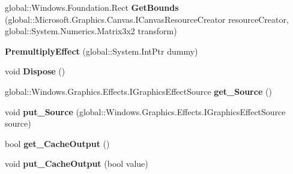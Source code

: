 \begin{DoxyCompactItemize}
global\+::\+Windows.\+Foundation.\+Rect {\bfseries Get\+Bounds} (global\+::\+Microsoft.\+Graphics.\+Canvas.\+I\+Canvas\+Resource\+Creator resource\+Creator, global\+::\+System.\+Numerics.\+Matrix3x2 transform)
\item 
\mbox{\label{class_microsoft_1_1_graphics_1_1_canvas_1_1_effects_1_1_premultiply_effect_a8186cf7bd26fe373a3ab0216db4f0f3a}} 
{\bfseries Premultiply\+Effect} (global\+::\+System.\+Int\+Ptr dummy)
\item 
\mbox{\label{class_microsoft_1_1_graphics_1_1_canvas_1_1_effects_1_1_premultiply_effect_a5fc45f472f6b09a3d1441141d658dbce}} 
void {\bfseries Dispose} ()
\item 
\mbox{\label{class_microsoft_1_1_graphics_1_1_canvas_1_1_effects_1_1_premultiply_effect_a8c8c30dc5766fa4177f8eae0c877a43b}} 
global\+::\+Windows.\+Graphics.\+Effects.\+I\+Graphics\+Effect\+Source {\bfseries get\+\_\+\+Source} ()
\item 
\mbox{\label{class_microsoft_1_1_graphics_1_1_canvas_1_1_effects_1_1_premultiply_effect_a26d18606e78cafec090c0e8e592ebf37}} 
void {\bfseries put\+\_\+\+Source} (global\+::\+Windows.\+Graphics.\+Effects.\+I\+Graphics\+Effect\+Source source)
\item 
\mbox{\label{class_microsoft_1_1_graphics_1_1_canvas_1_1_effects_1_1_premultiply_effect_a0ec84e32cb7178d2686048d1ea442275}} 
bool {\bfseries get\+\_\+\+Cache\+Output} ()
\item 
\mbox{\label{class_microsoft_1_1_graphics_1_1_canvas_1_1_effects_1_1_premultiply_effect_a0c2a7e9d17a3cbdc492ba50a4feb6f79}} 
void {\bfseries put\+\_\+\+Cache\+Output} (bool value)
\item 
\mbox{\label{class_microsoft_1_1_graphics_1_1_canvas_1_1_effects_1_1_premultiply_effect_a9102cf1933088218defd9781ab82c7e8}} 

\end{DoxyCompactItemize}
